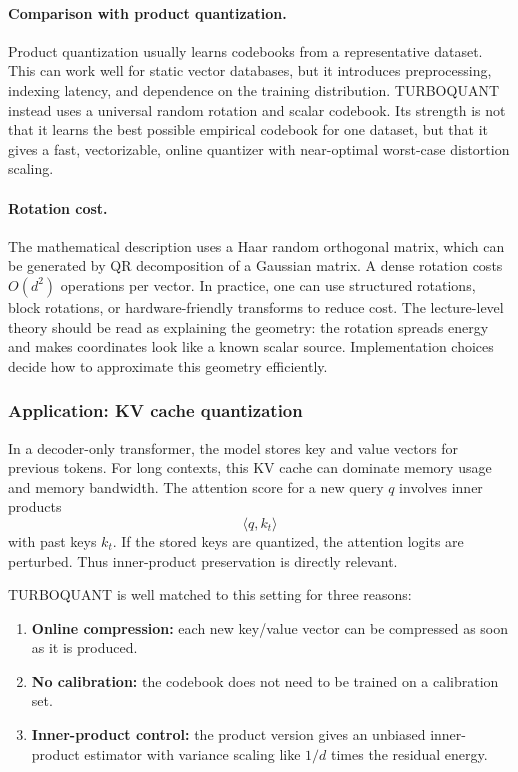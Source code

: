 \paragraph{Comparison with product quantization.}
Product quantization usually learns codebooks from a representative dataset.
This can work well for static vector databases, but it introduces preprocessing, indexing latency, and dependence on the training distribution.
TURBOQUANT instead uses a universal random rotation and scalar codebook.
Its strength is not that it learns the best possible empirical codebook for one dataset, but that it gives a fast, vectorizable, online quantizer with near-optimal worst-case distortion scaling.

\paragraph{Rotation cost.}
The mathematical description uses a Haar random orthogonal matrix, which can be generated by QR decomposition of a Gaussian matrix.
A dense rotation costs $O(d^2)$ operations per vector.
In practice, one can use structured rotations, block rotations, or hardware-friendly transforms to reduce cost.
The lecture-level theory should be read as explaining the geometry: the rotation spreads energy and makes coordinates look like a known scalar source.
Implementation choices decide how to approximate this geometry efficiently.

\subsubsection*{Application: KV cache quantization}

In a decoder-only transformer, the model stores key and value vectors for previous tokens.
For long contexts, this KV cache can dominate memory usage and memory bandwidth.
The attention score for a new query $q$ involves inner products
\begin{equation}
    \langle q,k_t\rangle
\end{equation}
with past keys $k_t$.
If the stored keys are quantized, the attention logits are perturbed.
Thus inner-product preservation is directly relevant.

TURBOQUANT is well matched to this setting for three reasons:
\begin{enumerate}[leftmargin=2em]
    \item \textbf{Online compression:} each new key/value vector can be compressed as soon as it is produced.
    \item \textbf{No calibration:} the codebook does not need to be trained on a calibration set.
    \item \textbf{Inner-product control:} the product version gives an unbiased inner-product estimator with variance scaling like $1/d$ times the residual energy.
\end{enumerate}

